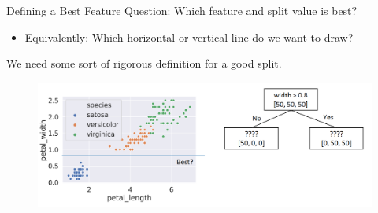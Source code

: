 \documentclass[aspectratio=169]{../latex_main/tntbeamer}  %
\begin{document}
	
	\begin{frame}{Defining a Best Feature}
	    Question: Which feature and split value is best?
	    \begin{itemize}
	        \item  Equivalently: Which horizontal or vertical line do we want to draw?
	    \end{itemize}
	   \alert{We need some sort of rigorous definition for a good split.}
	    \begin{figure}
	        \centering
	        \includegraphics[scale=.4]{Bild46}
	    \end{figure}
	\end{frame}
	
	
	
\end{document}
